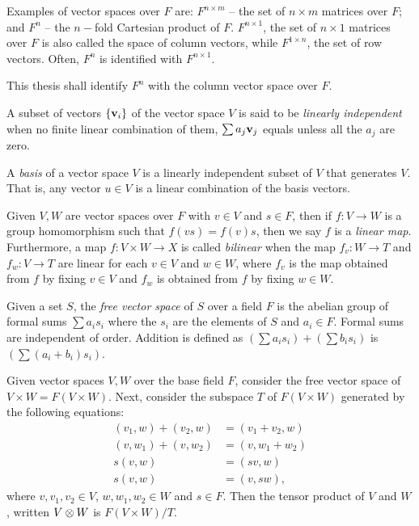 Examples of vector spaces over $F$ are: $F^{n\times m}$ -- the set of $n\times m$ matrices over
$F$; and $F^n$ -- the $n{-}$fold Cartesian product of $F$. $F^{n\times 1}$, the set of $n\times 1$
matrices over $F$ is also called the space of column vectors, while $F^{1\times n}$, the set of row
vectors. Often, $F^n$ is identified with $F^{n\times 1}$.


This thesis  shall identify $F^n$ with the column vector space over $F$.

\begin{definition}
  A subset of vectors $\{\mathbf{v}_i\}$ of the vector space $V$ is said to be \emph{linearly
  independent} when no finite linear combination of them, $\sum a_j\mathbf{v}_j$ equals  unless
  all the $a_j$ are zero.

\end{definition}

\begin{definition}[Basis]
  A \emph{basis} of a vector space $V$ is a linearly independent subset of $V$ that generates $V$.
  That is, any vector $u \in V$ is a linear combination of the basis vectors.
\end{definition}

\begin{definition}\label{def:linear_map_of_vector_spaces}
  Given $V, W$ are vector spaces over $F$ with $v \in V$ and $s \in F$, then
  if $f:V \to W$ is a group homomorphism such that $f(v s) = f(v) s$, then we say $f$ is a
  \emph{linear map}. Furthermore, a map $f:V\times W \to X$ is called \emph{bilinear} when the
  map $f_v:W\to T$ and $f_w:V\to T$ are linear for each $v\in V$ and $w\in W$, where $f_v$ is the
  map obtained from $f$ by fixing $v\in V$ and $f_w$ is obtained from $f$ by fixing  $w\in W$.
\end{definition}

\begin{definition}\label{def:free_vector_space}
  Given a set $S$, the \emph{free vector space} of $S$ over a field $F$ is the abelian group
  of formal sums $\sum a_i s_i$ where the $s_i$ are the elements of $S$ and $a_i \in F$.
  Formal sums are independent of order. Addition is defined as $(\sum a_i s_i) + (\sum b_i s_i)$ is
  $(\sum (a_i + b_i) s_i)$.
\end{definition}

\begin{definition}\label{def:tensor_product_of_vector_spaces}
  Given vector spaces $V, W$ over the base field $F$, consider the free vector space of $V
  \times W = F(V\times W)$. Next, consider the subspace $T$ of $F(V\times W)$ generated by the
  following equations:
  \begin{align*}
    (v_1,w)+(v_2,w) & = (v_1+v_2,w)\\
    (v,w_1)+(v,w_2) & = (v, w_1+w_2)\\
    s(v,w) &= (s v,w)\\
    s(v,w) &= (v,s w),
  \end{align*}
  where $v,v_1,v_2 \in V$, $w,w_1,w_2 \in W$ and $s\in F$. Then the tensor product of
  $V$ and $W$, written $V\otimes W$ is $F(V\times W)/T$.
\end{definition}

